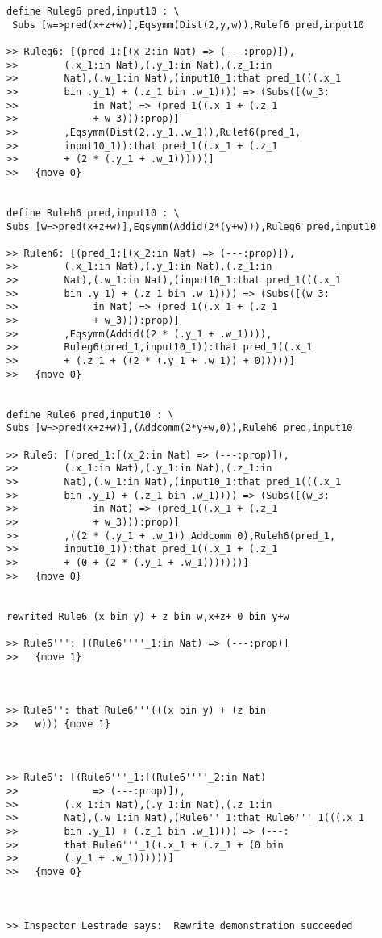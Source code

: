 \documentclass{article}
\begin{document}
\begin{verbatim}
define Ruleg6 pred,input10 : \
 Subs [w=>pred(x+z+w)],Eqsymm(Dist(2,y,w)),Rulef6 pred,input10

>> Ruleg6: [(pred_1:[(x_2:in Nat) => (---:prop)]),
>>        (.x_1:in Nat),(.y_1:in Nat),(.z_1:in 
>>        Nat),(.w_1:in Nat),(input10_1:that pred_1(((.x_1 
>>        bin .y_1) + (.z_1 bin .w_1)))) => (Subs([(w_3:
>>             in Nat) => (pred_1((.x_1 + (.z_1 
>>             + w_3))):prop)]
>>        ,Eqsymm(Dist(2,.y_1,.w_1)),Rulef6(pred_1,
>>        input10_1)):that pred_1((.x_1 + (.z_1 
>>        + (2 * (.y_1 + .w_1))))))]
>>   {move 0}


define Ruleh6 pred,input10 : \
Subs [w=>pred(x+z+w)],Eqsymm(Addid(2*(y+w))),Ruleg6 pred,input10

>> Ruleh6: [(pred_1:[(x_2:in Nat) => (---:prop)]),
>>        (.x_1:in Nat),(.y_1:in Nat),(.z_1:in 
>>        Nat),(.w_1:in Nat),(input10_1:that pred_1(((.x_1 
>>        bin .y_1) + (.z_1 bin .w_1)))) => (Subs([(w_3:
>>             in Nat) => (pred_1((.x_1 + (.z_1 
>>             + w_3))):prop)]
>>        ,Eqsymm(Addid((2 * (.y_1 + .w_1)))),
>>        Ruleg6(pred_1,input10_1)):that pred_1((.x_1 
>>        + (.z_1 + ((2 * (.y_1 + .w_1)) + 0)))))]
>>   {move 0}


define Rule6 pred,input10 : \
Subs [w=>pred(x+z+w)],(Addcomm(2*y+w,0)),Ruleh6 pred,input10

>> Rule6: [(pred_1:[(x_2:in Nat) => (---:prop)]),
>>        (.x_1:in Nat),(.y_1:in Nat),(.z_1:in 
>>        Nat),(.w_1:in Nat),(input10_1:that pred_1(((.x_1 
>>        bin .y_1) + (.z_1 bin .w_1)))) => (Subs([(w_3:
>>             in Nat) => (pred_1((.x_1 + (.z_1 
>>             + w_3))):prop)]
>>        ,((2 * (.y_1 + .w_1)) Addcomm 0),Ruleh6(pred_1,
>>        input10_1)):that pred_1((.x_1 + (.z_1 
>>        + (0 + (2 * (.y_1 + .w_1)))))))]
>>   {move 0}


rewrited Rule6 (x bin y) + z bin w,x+z+ 0 bin y+w

>> Rule6''': [(Rule6''''_1:in Nat) => (---:prop)]
>>   {move 1}



>> Rule6'': that Rule6'''(((x bin y) + (z bin 
>>   w))) {move 1}



>> Rule6': [(Rule6'''_1:[(Rule6''''_2:in Nat) 
>>             => (---:prop)]),
>>        (.x_1:in Nat),(.y_1:in Nat),(.z_1:in 
>>        Nat),(.w_1:in Nat),(Rule6''_1:that Rule6'''_1(((.x_1 
>>        bin .y_1) + (.z_1 bin .w_1)))) => (---:
>>        that Rule6'''_1((.x_1 + (.z_1 + (0 bin 
>>        (.y_1 + .w_1))))))]
>>   {move 0}



>> Inspector Lestrade says:  Rewrite demonstration succeeded

\end{verbatim}
\end{document}
